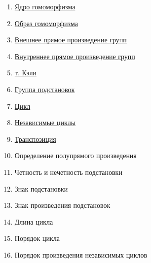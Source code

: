 \documentclass[12pt]{article}
\begin{document}
\begin{enumerate}
					\item \hyperlink{indef:morfizm}{Ядро гомоморфизма}
					\item \hyperlink{indef:morfizm}{Образ гомоморфизма}
					\item \hyperlink{def:comp}{Внешнее прямое произведение групп}
					\item \hyperlink{def:in_comp}{Внутреннее прямое произведение групп}
					\item \hyperlink{th:keli}{т. Кэли}				
					\item \hyperlink{el}{Группа подстановок}
					\item \hyperlink{def:while}{Цикл}
					\item \hyperlink{def:while}{Независимые циклы}
					\item \hyperlink{def:while}{Транспозиция}
					\item Определение полупрямого произведения
					\item Четность и нечетность подстановки
					\item Знак подстановки
					\item Знак произведения подстановок 
					\item Длина цикла
					\item Порядок цикла
					\item Порядок произведения независимых циклов
				\end{enumerate}
		
		
		
		
		
		
		
		
		
\end{document}
